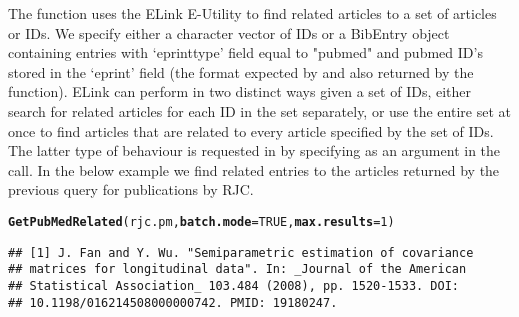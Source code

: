 \documentclass[article]{jss}\usepackage[]{graphicx}\usepackage[]{color}
\makeatletter
\newcommand{\hlnum}[1]{\textcolor[rgb]{0.125,0.125,1}{#1}}%
\newcommand{\hlstd}[1]{\textcolor[rgb]{0.251,0.251,0.282}{#1}}%
\newcommand{\hlkwc}[1]{\textcolor[rgb]{0.529,0,0.184}{\textbf{#1}}}%
\newcommand{\hlkwd}[1]{\textcolor[rgb]{0.251,0.251,0.282}{\textbf{#1}}}%
\newenvironment{kframe}{%
 \def\at@end@of@kframe{}%
 \ifinner\ifhmode%
  \def\at@end@of@kframe{\end{minipage}}%
  \begin{minipage}{\columnwidth}%
 \fi\fi%
 \def\FrameCommand##1{\hskip\@totalleftmargin \hskip-\fboxsep
 \colorbox{shadecolor}{##1}\hskip-\fboxsep
     \hskip-\linewidth \hskip-\@totalleftmargin \hskip\columnwidth}%
 \MakeFramed {\advance\hsize-\width
   \@totalleftmargin\z@ \linewidth\hsize
   \@setminipage}}%
 {\par\unskip\endMakeFramed%
 \at@end@of@kframe}
\newenvironment{knitrout}{}{} %
\makeatother
\begin{document}
The  function uses the ELink E-Utility to find related articles to a set of articles or IDs.  We specify either a character vector of IDs or a BibEntry object containing entries with `eprinttype' field equal to "pubmed" and pubmed ID's stored in the `eprint' field (the format expected by \Biblatex{} and also returned by the  function).  ELink can perform in two distinct ways given a set of IDs, either search for related articles for each ID in the set separately, or use the entire set at once to find articles that are related to every article specified by the set of IDs.  The latter type of behaviour is requested in  by specifying  as an argument in the call.  In the below example we find related entries to the articles returned by the previous query for publications by RJC.
\begin{knitrout}
\color{fgcolor}\begin{kframe}
\begin{alltt}
\hlkwd{GetPubMedRelated}\hlstd{(rjc.pm,} \hlkwc{batch.mode} \hlstd{=} \hlnum{TRUE}\hlstd{,} \hlkwc{max.results} \hlstd{=} \hlnum{1}\hlstd{)}
\end{alltt}
\begin{verbatim}
## [1] J. Fan and Y. Wu. "Semiparametric estimation of covariance
## matrices for longitudinal data". In: _Journal of the American
## Statistical Association_ 103.484 (2008), pp. 1520-1533. DOI:
## 10.1198/016214508000000742. PMID: 19180247.
\end{verbatim}
\end{kframe}
\end{knitrout}
\end{document}
